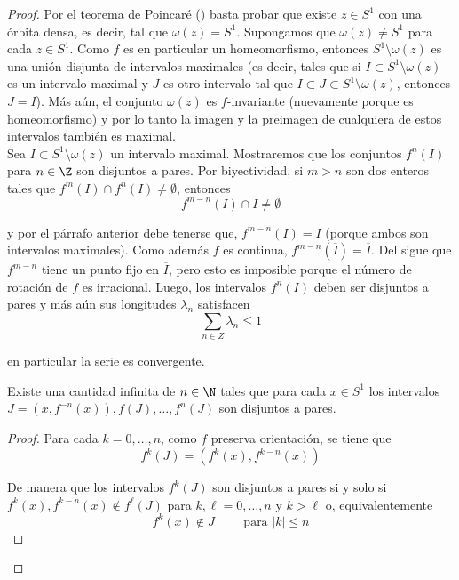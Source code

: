 \documentclass[	docname= Sistemas\ Din\'amicos,
				finished=1,
				semester=1,
				year=2017,
				professor=Godofredo\ Iommi,
				sigla=MAT2565]{apunte}
\begin{document}
\begin{proof} Por el teorema de Poincaré () basta probar que existe $z \in S^{1}$ con una órbita densa, es decir, tal que $\omega(z) = S^{1}$. Supongamos que $\omega(z) \neq S^{1}$ para cada $z \in S^{1}$. Como $f$ es en particular un homeomorfismo, entonces $S^{1} \setminus \omega(z)$ es una unión disjunta de intervalos maximales (es decir, tales que si $I \subset S^{1} \setminus \omega(z)$ es un intervalo maximal y $J$ es otro intervalo tal que $I \subset J \subset S^{1} \setminus \omega(z)$, entonces $J = I$). Más aún, el conjunto $\omega(z)$ es $f$-invariante (nuevamente porque es homeomorfismo) y por lo tanto la imagen y la preimagen de cualquiera de estos intervalos también es maximal.	\\

Sea $I \subset S^{1} \setminus \omega(z)$ un intervalo maximal. Mostraremos que los conjuntos $f^{n}(I)$ para $n \in \Z$ son disjuntos a pares. Por biyectividad, si $m > n$ son dos enteros tales que $f^{m}(I) \cap f^{n}(I) \neq \emptyset$, entonces
	$$f^{m-n}(I) \cap I \neq \emptyset$$

y por el párrafo anterior debe tenerse que, $f^{m-n}(I) = I$ (porque ambos son intervalos maximales). Como además $f$ es continua, $f^{m-n}(\overline{I}) = \overline{I}$. Del  sigue que $f^{m-n}$ tiene un punto fijo en $\overline{I}$, pero esto es imposible porque el número de rotación de $f$ es irracional. Luego, los intervalos $f^{n}(I)$ deben ser disjuntos a pares y más aún sus longitudes $\lambda_{n}$ satisfacen
	$$\sum_{n \in Z} \lambda_{n} \leq 1$$

en particular la serie es convergente.

	\begin{afirmacion}
		\item Existe una cantidad infinita de $n \in \N$ tales que para cada $x \in S^{1}$ los intervalos $J = (x, f^{-n}(x)), f(J), \ldots, f^{n}(J)$ son disjuntos a pares.
		
		\begin{proof} Para cada $k = 0, \ldots, n$, como $f$ preserva orientación, se tiene que
			$$f^{k}(J) = (f^{k}(x) , f^{k-n}(x))$$
		
		De manera que los intervalos $f^{k}(J)$ son disjuntos a pares si y solo si $f^{k}(x), f^{k-n}(x) \notin f^{\ell}(J)$ para $k,\ell = 0, \ldots, n$ y $k > \ell$ o, equivalentemente
			$$f^{k}(x) \notin J \qquad \text{ para } |k| \leq n$$
		

\end{proof}
\end{afirmacion}
\end{proof}
\end{document}
